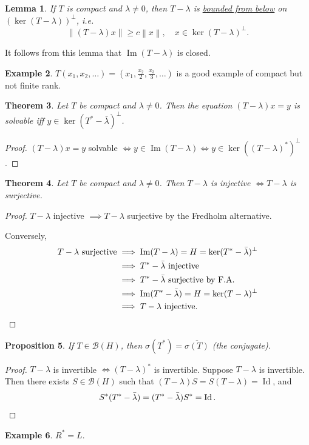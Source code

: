 \documentclass[12pt]{article}
\DeclareMathOperator{\Id}{Id}
\renewcommand{\Im}{\operatorname{Im}}
\newcommand{\norm}[1]{\left\| #1 \right\|}
\newcommand{\cB}{\mathcal{B}}
\newtheorem{thm}{Theorem}[section]
\newtheorem{lma}[thm]{Lemma}
\newtheorem{prop}[thm]{Proposition}
\theoremstyle{definition}
\newtheorem{ex}[thm]{Example}
\begin{document}
\begin{lma}
	If $T$ is compact and $\lambda \neq 0$, then $T - \lambda$ is \underline{bounded from below} on $(\ker(T-\lambda))^\perp$, i.e.
	\begin{equation*}
		\norm{(T-\lambda)x} \geq c \norm{x}, \quad x \in \ker(T-\lambda)^\perp.
	\end{equation*}
\end{lma}

\noindent It follows from this lemma that $\Im(T-\lambda)$ is closed.

\begin{ex}
	$T(x_1, x_2, \dots) = \left( x_1, \frac{x_2}{2}, \frac{x_3}{3}, \dots \right)$ is a good example of compact but not finite rank.
\end{ex}

\begin{thm}
	Let $T$ be compact and $\lambda \neq 0$.
	Then the equation $(T-\lambda)x = y$ is solvable iff $y \in \ker(T^* - \bar{\lambda})^\perp$.
\end{thm}
\begin{proof}
	$(T-\lambda)x = y$ solvable $\iff y \in \Im(T-\lambda) \iff y \in \ker((T-\lambda)^*)^\perp$.
\end{proof}

\begin{thm}
	Let $T$ be compact and $\lambda \neq 0$.
	Then $T - \lambda$ is injective $\iff T - \lambda$ is surjective.
\end{thm}
\begin{proof}
	$T-\lambda$ injective $\implies T-\lambda$ surjective by the Fredholm alternative.

	Conversely,
	\begin{align*}
		T - \lambda \text{ surjective} &\implies \Im(T-\lambda) = H = \ker(T^* - \bar{\lambda})^\perp \\
		&\implies T^* - \bar{\lambda} \text{ injective} \\
		&\implies T^* - \bar{\lambda} \text{ surjective by F.A.} \\
		&\implies \Im(T^* - \bar{\lambda}) = H = \ker(T-\lambda)^\perp \\
		&\implies T - \lambda \text{ injective}. \qquad\qedhere
	\end{align*}
\end{proof}

\begin{prop}
	If $T \in \cB(H)$, then $\sigma(T^*) = \overline{\sigma(T)}$ (the conjugate).
\end{prop}
\begin{proof}
	$T - \lambda$ is invertible $\iff (T-\lambda)^*$ is invertible.
	Suppose $T - \lambda$ is invertible.
	Then there exists $S \in \cB(H)$ such that $(T-\lambda)S = S(T-\lambda) = \Id$, and
	\begin{equation*}
		S^*(T^* - \bar{\lambda}) = (T^* - \bar{\lambda})S^* = \Id. \qedhere
	\end{equation*}
\end{proof}

\begin{ex}
	$R^* = L$.
\end{ex}
\end{document}
